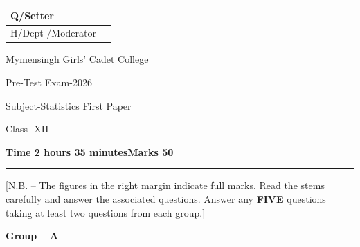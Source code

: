 \documentclass[12pt]{article}
\begin{document}
\noindent
\begin{minipage}[t]{0.34\textwidth}
\vspace{0pt}
\renewcommand{\arraystretch}{1.3}
\begin{tabular}{|l|p{12mm}|}
\hline
Q/Setter & \\ \hline
H/Dept /Moderator & \\ \hline
\end{tabular}
\end{minipage}%
\begin{minipage}[t]{0.37\textwidth}
\vspace{0pt}
\raggedright
Mymensingh Girls' Cadet College\par
Pre-Test Exam-2026\par
Subject-Statistics First Paper\par
Class- XII\par
\end{minipage}%
\begin{minipage}[t]{0.29\textwidth}
\vspace{0pt}
\raggedleft
\setlength{\fboxsep}{4pt}
\renewcommand{\arraystretch}{1.2}
\par
\end{minipage}

\smallskip
\noindent\textbf{Time 2 hours 35 minutes}\hfill\textbf{Marks 50}\par\smallskip

\hrule
\begin{center}
[N.B. -- The figures in the right margin indicate full marks. Read the stems carefully and answer the associated questions. Answer any \textbf{FIVE} questions taking at least two questions from each group.]
\end{center}

\begin{center}
\textbf{Group -- A}
\end{center}
\end{document}
